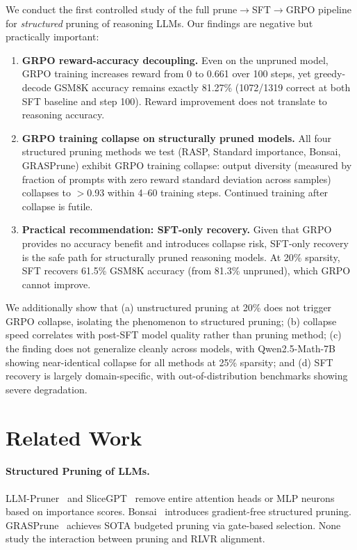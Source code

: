 \documentclass[11pt,a4paper]{article}
\begin{document}
We conduct the first controlled study of the full prune$\to$SFT$\to$GRPO pipeline for \emph{structured} pruning of reasoning LLMs. Our findings are negative but practically important:

\begin{enumerate}
\item \textbf{GRPO reward-accuracy decoupling.} Even on the unpruned model, GRPO training increases reward from 0 to 0.661 over 100 steps, yet greedy-decode GSM8K accuracy remains exactly 81.27\% (1072/1319 correct at both SFT baseline and step 100). Reward improvement does not translate to reasoning accuracy.

\item \textbf{GRPO training collapse on structurally pruned models.} All four structured pruning methods we test (RASP, Standard importance, Bonsai, GRASPrune) exhibit GRPO training collapse: output diversity (measured by fraction of prompts with zero reward standard deviation across samples) collapses to $>$0.93 within 4--60 training steps. Continued training after collapse is futile.

\item \textbf{Practical recommendation: SFT-only recovery.} Given that GRPO provides no accuracy benefit and introduces collapse risk, SFT-only recovery is the safe path for structurally pruned reasoning models. At 20\% sparsity, SFT recovers 61.5\% GSM8K accuracy (from 81.3\% unpruned), which GRPO cannot improve.
\end{enumerate}

We additionally show that (a) unstructured pruning at 20\% does not trigger GRPO collapse, isolating the phenomenon to structured pruning; (b) collapse speed correlates with post-SFT model quality rather than pruning method; (c) the finding does not generalize cleanly across models, with Qwen2.5-Math-7B showing near-identical collapse for all methods at 25\% sparsity; and (d) SFT recovery is largely domain-specific, with out-of-distribution benchmarks showing severe degradation.

\section{Related Work}
\label{sec:related}

\paragraph{Structured Pruning of LLMs.}
LLM-Pruner~\cite{ma2024llmpruner} and SliceGPT~\cite{ashkboos2024slicegpt} remove entire attention heads or MLP neurons based on importance scores. Bonsai~\cite{bonsai2025} introduces gradient-free structured pruning. GRASPrune~\cite{graspune2026} achieves SOTA budgeted pruning via gate-based selection. None study the interaction between pruning and RLVR alignment.
\end{document}
